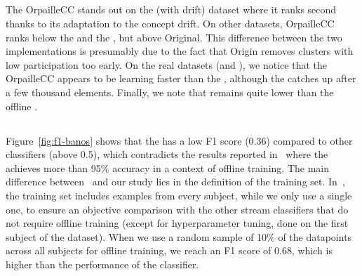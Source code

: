\subsection{\mcnn}

The \mcnn OrpailleCC stands out on the \banosdataset (with drift) dataset where it
ranks second thanks to its adaptation to the concept drift.  On other datasets,
\mcnn OrpailleCC ranks below the \mondrianforest and the \hoeffdingtree, but
above \mcnn Original. This difference between the two \mcnn implementations is presumably due
to the fact that \mcnn Origin removes clusters with low participation too early.
On the real datasets (\banosdataset and \recofitdataset), we notice that the
\mcnn OrpailleCC appears to be learning faster than the \mondrianforest,
although the \mondrianforest catches up after a few thousand elements. Finally,
we note that \mcnn remains quite lower than the offline \knn.

\subsection{\FNN}

Figure~\ref{fig:f1-banos} shows that the \FNN has a low F1 score (0.36)
compared to other classifiers (above 0.5), which contradicts the results
reported in~\cite{omid_2019} where the \FNN achieves more than 95\%
accuracy in a context of offline training. The main difference
between~\cite{omid_2019} and our study lies in the definition of the
training set. In~\cite{omid_2019}, the training set includes examples from
every subject, while we only use a single one, to ensure an objective
comparison with the other stream classifiers that do not require offline
training (except for hyperparameter tuning, done on the first subject of
the \banosdataset dataset). When we use a random sample of 10\% of the
datapoints across all subjects for offline training, we reach an F1 score
of 0.68, which is higher than the performance of the \naivebayes classifier.


